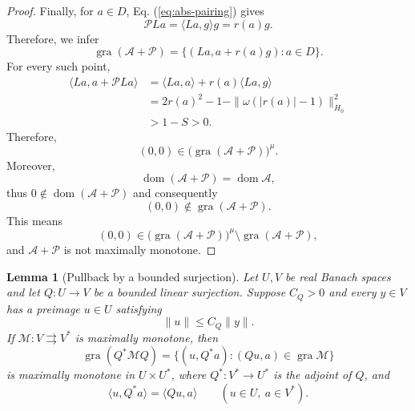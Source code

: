 \documentclass[11pt]{article}
\newcommand{\gra}{\operatorname{gra}}
\newcommand{\dom}{\operatorname{dom}}
\newcommand{\pair}[2]{\langle #1,#2\rangle}
\newtheorem{lemma}{Lemma}
\theoremstyle{definition}
\theoremstyle{remark}
\begin{document}
\begin{proof}
Finally, for $a\in D$, Eq. (\ref{eq:abs-pairing}) gives
\[
\mathcal PLa
=
\pair{La}{g}g
=
r(a)g.
\]
Therefore, we infer 
\[
\gra(\mathcal A+\mathcal P)
=
\{(La,a+r(a)g):a\in D\}.
\]
For every such point,
\[
\begin{aligned}
\pair{La}{a+\mathcal PLa}
&=\pair{La}{a}+r(a)\pair{La}{g}\\
&=2r(a)^2-1-\|\omega(|r(a)|-1)\|_{H_0}^2\\
&>1-S>0.
\end{aligned}
\]
Therefore,
\[
(0,0)\in
\bigl(\gra(\mathcal A+\mathcal P)\bigr)^\mu.
\]
Moreover,
\[
\dom(\mathcal A+\mathcal P)
=
\dom\mathcal A,
\]
thus $0\notin\dom(\mathcal A+\mathcal P)$ and consequently
\[
(0,0)\notin\gra(\mathcal A+\mathcal P).
\]
This means
\[
(0,0)\in
\bigl(\gra(\mathcal A+\mathcal P)\bigr)^\mu
\setminus
\gra(\mathcal A+\mathcal P),
\]
and $\mathcal A+\mathcal P$ is not maximally monotone.
\end{proof}

\begin{lemma}[Pullback by a bounded surjection]
\label{lem:surjection-transport}
Let $U,V$ be real Banach spaces and let $Q:U\to V$ be a bounded linear surjection. Suppose $C_Q>0$ and every $y\in V$ has a preimage $u\in U$ satisfying
\[
\|u\|\le C_Q\|y\|.
\]
If $\mathcal M:V\rightrightarrows V^*$ is maximally monotone, then
\[
\gra(Q^*\mathcal M Q)
=
\{(u,Q^*a):(Qu,a)\in\gra\mathcal M\}
\]
is maximally monotone in $U\times U^*$, where $Q^*:V^*\to U^*$ is the adjoint of $Q$, and
\[
\pair{u}{Q^*a}=\pair{Qu}{a}
\qquad(u\in U,\ a\in V^*).
\]
\end{lemma}
\end{document}
